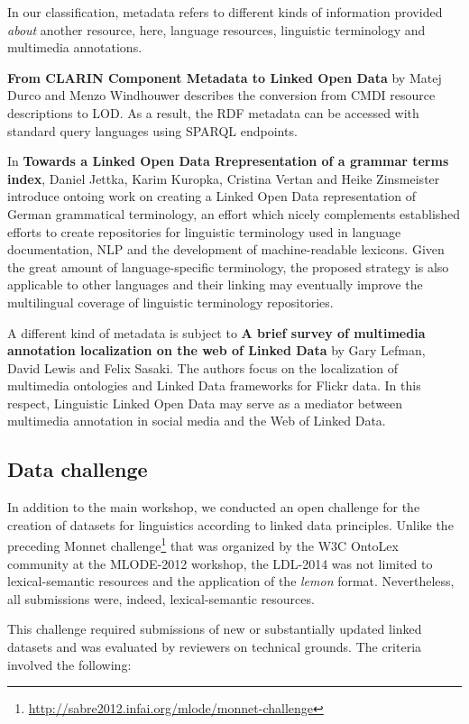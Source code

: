 	In our classification, metadata refers to different kinds of information provided \emph{about} another resource, here, language resources, linguistic terminology and multimedia annotations.
	
	\textbf{From CLARIN Component Metadata to Linked Open Data} by 
	Matej Durco and Menzo Windhouwer describes the conversion from CMDI resource descriptions to LOD. 
	As a result, the RDF metadata can be accessed with standard query languages using SPARQL endpoints. 

	In \textbf{Towards a Linked Open Data Rrepresentation of a grammar terms index},
	Daniel Jettka, Karim Kuropka, Cristina Vertan and Heike Zinsmeister introduce ontoing work on creating a Linked Open Data 
	representation of German grammatical terminology, an effort which nicely complements established efforts to create repositories for linguistic terminology used in language documentation, NLP and the development of machine-readable lexicons. Given the great amount of language-specific terminology, the proposed strategy is also applicable to other languages and their linking may eventually improve the multilingual coverage of linguistic terminology repositories.

	A different kind of metadata is subject to \textbf{A brief survey of multimedia annotation localization on the web of Linked Data} by 
	Gary Lefman, David Lewis and Felix Sasaki. The authors focus on the localization of multimedia ontologies and Linked Data frameworks for Flickr data. 
	In this respect, Linguistic Linked Open Data may serve as a mediator between multimedia annotation in social media and the Web of Linked Data. 

\subsection{Data challenge}

In addition to the main workshop, we conducted an open challenge for the creation of datasets for linguistics according to linked data principles.
Unlike the preceding Monnet challenge\footnote{
	\url{http://sabre2012.infai.org/mlode/monnet-challenge}
} 
that was organized by the W3C OntoLex community at the MLODE-2012 workshop, the LDL-2014 was not limited to lexical-semantic resources and the application of the \emph{lemon} format. 
Nevertheless, all submissions were, indeed, lexical-semantic resources.
 
This challenge required submissions of new or substantially updated linked datasets and was evaluated by reviewers on technical grounds. 
The criteria involved the following: 


